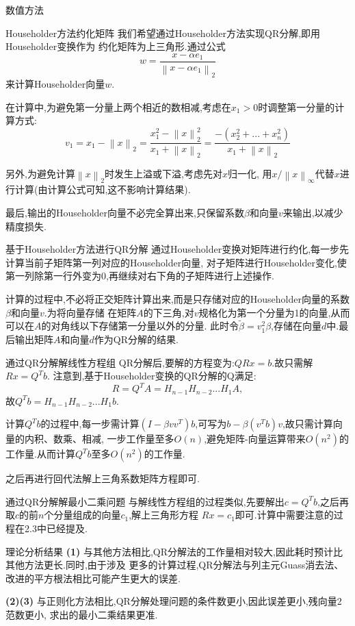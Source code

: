 \documentclass{article}
\begin{document}
\begin{section}{数值方法}
    \begin{subsection}{Householder方法约化矩阵}
        我们希望通过Householder方法实现QR分解,即用Householder变换作为
    约化矩阵为上三角形.通过公式$$w = \dfrac{x-\alpha e_1}{\left\lVert x-\alpha e_1\right\rVert_2}$$
    来计算Householder向量$w$.

    在计算中,为避免第一分量上两个相近的数相减,考虑在$x_1>0$时调整第一分量的计算方式:
    $$v_1 = x_1-\left\lVert x\right\rVert_2 = \dfrac{x_1^2-\left\lVert x\right\rVert_2^2}{x_1+\left\lVert x\right\rVert_2} 
     = \dfrac{-(x_2^2+...+x_n^2)}{x_1+\left\lVert x\right\rVert_2}$$

    另外,为避免计算$\left\lVert x\right\rVert_2 $时发生上溢或下溢,考虑先对$x$归一化,
    用$x/\left\lVert x\right\rVert_{\infty} $代替$x$进行计算(由计算公式可知,这不影响计算结果).

    最后,输出的Householder向量不必完全算出来,只保留系数$\beta$和向量$v$来输出,以减少精度损失.
    \end{subsection}
    \begin{subsection}{基于Householder方法进行QR分解}
        通过Householder变换对矩阵进行约化,每一步先计算当前子矩阵第一列对应的Householder向量,
    对子矩阵进行Householder变化,使第一列除第一行外变为0,再继续对右下角的子矩阵进行上述操作.

    计算的过程中,不必将正交矩阵计算出来,而是只存储对应的Householder向量的系数$\beta$和向量$v$.为将向量存储
    在矩阵$A$的下三角,对$v$规格化为第一个分量为1的向量,从而可以在$A$的对角线以下存储第一分量以外的分量.
    此时令$\tilde{\beta}=v_1^2\beta$,存储在向量$d$中.最后输出矩阵$A$和向量$d$作为QR分解的结果.
    \end{subsection}
    \begin{subsection}{通过QR分解解线性方程组}
        QR分解后,要解的方程变为:$QRx = b$.故只需解$Rx = Q^Tb$.
        注意到,基于Householder变换的QR分解的Q满足:
        $$R=Q^TA = H_{n-1}H_{n-2}...H_1A,$$
        故$Q^Tb = H_{n-1}H_{n-2}...H_1b$.
        
        计算$Q^Tb$的过程中,每一步需计算$(I-\beta vv^T)b$,可写为$b-\beta(v^Tb)v$,故只需计算向量的内积、数乘、相减,
        一步工作量至多$O(n)$,避免矩阵-向量运算带来$O(n^2)$的工作量.从而计算$Q^Tb$至多$O(n^2)$的工作量.
        
        之后再进行回代法解上三角系数矩阵方程即可.
    \end{subsection}
    \begin{subsection}{通过QR分解解最小二乘问题}
        与解线性方程组的过程类似,先要解出$c = Q^Tb$,之后再取$c$的前$n$个分量组成的向量$c_1$,解上三角形方程
        $Rx = c_1$即可.计算中需要注意的过程在2.3中已经提及.
    \end{subsection}
\end{section}
\begin{section}{理论分析结果}
    \noindent\textbf{(1)} 与其他方法相比,QR分解法的工作量相对较大,因此耗时预计比其他方法更长.同时,由于涉及
    更多的计算过程,QR分解法与列主元Guass消去法、改进的平方根法相比可能产生更大的误差.

    \noindent\textbf{(2)(3)} 与正则化方法相比,QR分解处理问题的条件数更小,因此误差更小,残向量2范数更小,
    求出的最小二乘结果更准.
\end{section}
\end{document}
